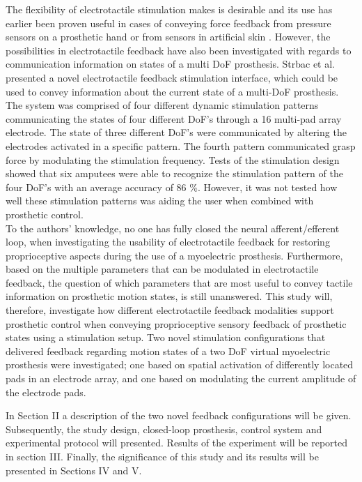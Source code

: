 %
The flexibility of electrotactile stimulation makes is desirable and its use has earlier been proven useful in cases of conveying force feedback from pressure sensors on a prosthetic hand or from sensors in artificial skin \cite{Hartmann2014,Franceschi2015}. However, the possibilities in electrotactile feedback have also been investigated with regards to communication information on states of a multi DoF prosthesis. Strbac et al. \cite{Strbac2016} presented a novel electrotactile feedback stimulation interface, which could be used to convey information about the current state of a multi-DoF prosthesis. The system was comprised of four different dynamic stimulation patterns communicating the states of four different DoF's through a 16 multi-pad array electrode. The state of three different DoF's were communicated by altering the electrodes activated in a specific pattern. The fourth pattern communicated grasp force by modulating the stimulation frequency. Tests of the stimulation design showed that six amputees were able to recognize the stimulation pattern of the four DoF's with an average accuracy of 86 \%. \cite{Strbac2016} However, it was not tested how well these stimulation patterns was aiding the user when combined with prosthetic control.  \\   
%
To the authors' knowledge, no one has fully closed the neural afferent/efferent loop, when investigating the usability of electrotactile feedback for restoring proprioceptive aspects during the use of a myoelectric prosthesis. Furthermore, based on the multiple parameters that can be modulated in electrotactile feedback, the question of which parameters that are most useful to convey tactile information on prosthetic motion states, is still unanswered. This study will, therefore, investigate how different electrotactile feedback modalities support prosthetic control when conveying proprioceptive sensory feedback of prosthetic states using a stimulation setup. Two novel stimulation configurations that delivered feedback regarding motion states of a two DoF virtual myoelectric prosthesis were investigated; one based on spatial activation of differently located pads in an electrode array, and one based on modulating the current amplitude of the electrode pads.

In Section II a description of the two novel feedback configurations will be given. Subsequently, the study design, closed-loop prosthesis, control system and experimental protocol will presented. Results of the experiment will be reported in section III. Finally, the significance of this study and its results will be presented in Sections IV and V. 
















